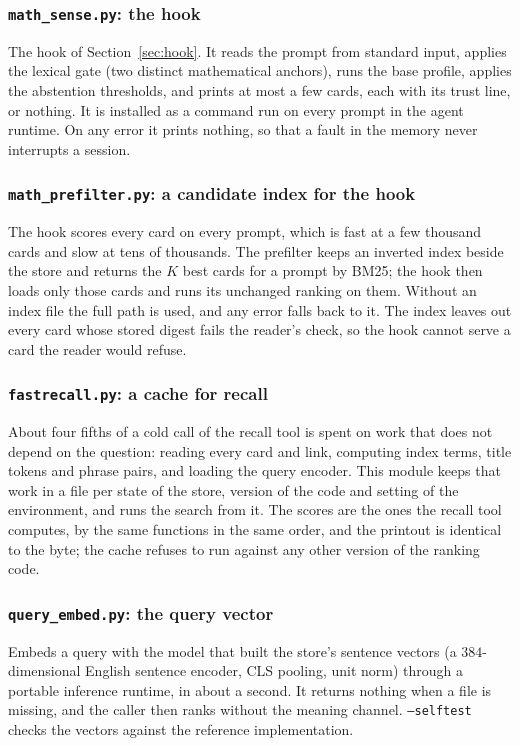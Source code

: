 \subsubsection*{\texttt{math\_sense.py}: the hook}
The hook of Section~\ref{sec:hook}. It reads the prompt from standard input, applies the lexical gate (two distinct mathematical anchors), runs the base profile, applies the abstention thresholds, and prints at most a few cards, each with its trust line, or nothing. It is installed as a command run on every prompt in the agent runtime. On any error it prints nothing, so that a fault in the memory never interrupts a session.

\subsubsection*{\texttt{math\_prefilter.py}: a candidate index for the hook}
The hook scores every card on every prompt, which is fast at a few thousand cards and slow at tens of thousands. The prefilter keeps an inverted index beside the store and returns the $K$ best cards for a prompt by BM25; the hook then loads only those cards and runs its unchanged ranking on them. Without an index file the full path is used, and any error falls back to it. The index leaves out every card whose stored digest fails the reader's check, so the hook cannot serve a card the reader would refuse.

\subsubsection*{\texttt{fastrecall.py}: a cache for recall}
About four fifths of a cold call of the recall tool is spent on work that does not depend on the question: reading every card and link, computing index terms, title tokens and phrase pairs, and loading the query encoder. This module keeps that work in a file per state of the store, version of the code and setting of the environment, and runs the search from it. The scores are the ones the recall tool computes, by the same functions in the same order, and the printout is identical to the byte; the cache refuses to run against any other version of the ranking code.

\subsubsection*{\texttt{query\_embed.py}: the query vector}
Embeds a query with the model that built the store's sentence vectors (a $384$-dimensional English sentence encoder, CLS pooling, unit norm) through a portable inference runtime, in about a second. It returns nothing when a file is missing, and the caller then ranks without the meaning channel. \texttt{--selftest} checks the vectors against the reference implementation.


